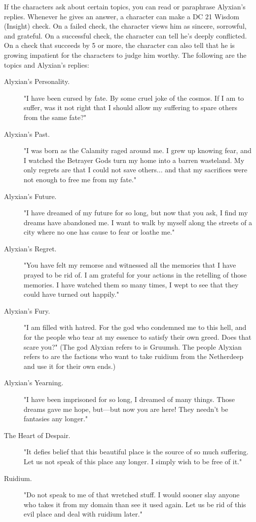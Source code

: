 \documentclass[a4paper, 11pt, bg=full, twocolumn, nooutline]{dndbook}
\begin{document}
If the characters ask about certain topics, you can read or paraphrase Alyxian's replies. Whenever he gives an answer, a character can make a DC 21 Wisdom (Insight) check. On a failed check, the character views him as sincere, sorrowful, and grateful. On a successful check, the character can tell he's deeply conflicted. On a check that succeeds by 5 or more, the character can also tell that he is growing impatient for the characters to judge him worthy. The following are the topics and Alyxian's replies:

\begin{description}
\item[Alyxian's Personality.] "I have been cursed by fate. By some cruel joke of the cosmos. If I am to suffer, was it not right that I should allow my suffering to spare others from the same fate?"
\item[Alyxian's Past.] "I was born as the Calamity raged around me. I grew up knowing fear, and I watched the Betrayer Gods turn my home into a barren wasteland. My only regrets are that I could not save others... and that my sacrifices were not enough to free me from my fate."
\item[Alyxian's Future.] "I have dreamed of my future for so long, but now that you ask, I find my dreams have abandoned me. I want to walk by myself along the streets of a city where no one has cause to fear or loathe me."
\item[Alyxian's Regret.] "You have felt my remorse and witnessed all the memories that I have prayed to be rid of. I am grateful for your actions in the retelling of those memories. I have watched them so many times, I wept to see that they could have turned out happily."
\item[Alyxian's Fury.] "I am filled with hatred. For the god who condemned me to this hell, and for the people who tear at my essence to satisfy their own greed. Does that scare you?" (The god Alyxian refers to is Gruumsh. The people Alyxian refers to are the factions who want to take ruidium from the Netherdeep and use it for their own ends.)
\item[Alyxian's Yearning.] "I have been imprisoned for so long, I dreamed of many things. Those dreams gave me hope, but---but now you are here! They needn't be fantasies any longer."
\item[The Heart of Despair.] "It defies belief that this beautiful place is the source of so much suffering. Let us not speak of this place any longer. I simply wish to be free of it."
\item[Ruidium.] "Do not speak to me of that wretched stuff. I would sooner slay anyone who takes it from my domain than see it used again. Let us be rid of this evil place and deal with ruidium later."
\end{description}
\end{document}
